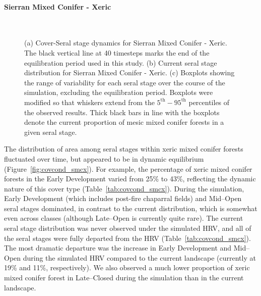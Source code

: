 \paragraph{Sierran Mixed Conifer - Xeric}

\begin{figure}[!htbp]
  \centering
   \\
  \caption{(a) Cover-Seral stage dynamics for Sierran Mixed Conifer - Xeric. The black vertical line at 40 timesteps marks the end of the equilibration period used in this study. (b) Current seral stage distribution for Sierran Mixed Conifer - Xeric. (c) Boxplots showing the range of variability for each seral stage over the course of the simulation, excluding the equilibration period. Boxplots were modified so that whiskers extend from the $5^{\text{th}} - 95^{\text{th}}$ percentiles of the observed results. Thick black bars in line with the boxplots denote the current proportion of mesic mixed conifer forests in a given seral stage.}  
  \label{fig:hrv-covcond_smcx}
\end{figure}

The distribution of area among seral stages within xeric mixed conifer forests fluctuated over time, but appeared to be in dynamic equilibrium (Figure~\ref{fig:covcond_smcx}). For example, the percentage of xeric mixed conifer forests in the Early Development varied from 25\% to 43\%, reflecting the dynamic nature of this cover type (Table~\ref{tab:covcond_smcx}). During the simulation, Early Development (which includes post-fire chaparral fields) and Mid--Open seral stages dominated, in contrast to the current distribution, which is somewhat even across classes (although Late--Open is currently quite rare).
%
The current seral stage distribution was never observed under the simulated HRV, and all of the seral stages were fully departed from the HRV (Table~\ref{tab:covcond_smcx}). The most dramatic departure was the increase in Early Development and Mid--Open during the simulated HRV compared to the current landscape (currently at 19\% and 11\%, respectively). We also observed a much lower proportion of xeric mixed conifer forest in Late--Closed during the simulation than in the current landscape. 

